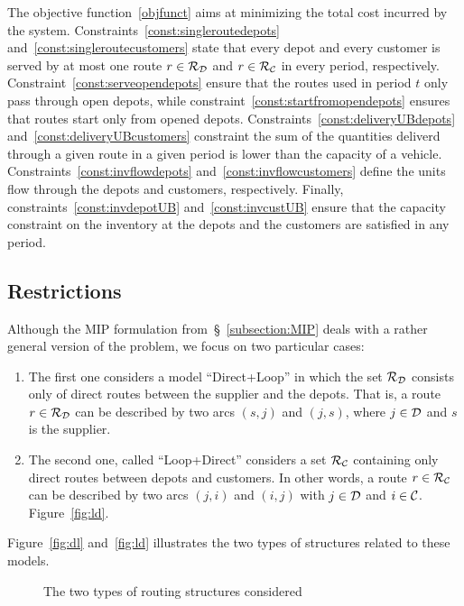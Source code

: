 \documentclass[10pt, a4paper]{article}
\begin{document}
The objective function~\eqref{objfunct} aims at minimizing the total cost incurred by the system. 
Constraints~\eqref{const:singleroutedepots} and~\eqref{const:singleroutecustomers} state that every depot and every customer is served by at most one route $r\in\mathcal{R_D}$ and $r\in\mathcal{R_C}$ in every period, respectively. 
Constraint~\eqref{const:serveopendepots} ensure that the routes used in period $t$ only pass through open depots, while constraint~\eqref{const:startfromopendepots} ensures that routes start only from opened depots. 
Constraints~\eqref{const:deliveryUBdepots} and~\eqref{const:deliveryUBcustomers} constraint the sum of the quantities deliverd through a given route in a given period is lower than the capacity of a vehicle. 
Constraints~\eqref{const:invflowdepots} and~\eqref{const:invflowcustomers} define the units flow through the depots and customers, respectively.
Finally, constraints~\eqref{const:invdepotUB} and~\eqref{const:invcustUB} ensure that the capacity constraint on the inventory at the depots and the customers are satisfied in any period. 

\subsection{Restrictions}
Although the MIP formulation from~\S~\ref{subsection:MIP} deals with a rather general version of the problem, we focus on two particular cases:
\begin{enumerate}
    \item The first one considers a model ``Direct+Loop'' in which the set $\mathcal{R_D}$ consists only of direct routes between the supplier and the depots. 
        That is, a route $r\in\mathcal{R_D}$ can be described by two arcs $(s,j)$ and $(j,s)$, where $j\in\mathcal{D}$ and $s$ is the supplier.
    \item The second one, called ``Loop+Direct'' considers a set $\mathcal{R_C}$ containing only direct routes between depots and customers. 
        In other words, a route $r\in\mathcal{R_C}$ can be described by two arcs $(j,i)$ and $(i,j)$ with $j\in\mathcal{D}$ and $i\in\mathcal{C}$. Figure~\ref{fig:ld}.
\end{enumerate}
Figure~\ref{fig:dl} and~\ref{fig:ld} illustrates the two types of structures related to these models.
\begin{figure}
    \centering
    \caption{The two types of routing structures considered}
\end{figure}



\end{document}
